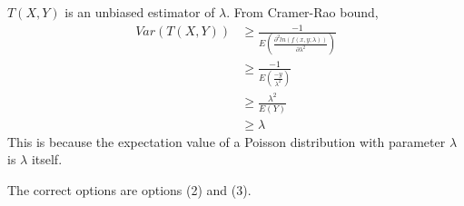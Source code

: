 \documentclass[twocolumn]{article}
\providecommand{\brak}[1]{\ensuremath{\left(#1\right)}}
\theoremstyle{remark}
\numberwithin{equation}{subsection}
\begin{document}
$T(X, Y)$ is an unbiased estimator of $\lambda$.
From Cramer-Rao bound,
\begin{align}
    Var(T(X, Y))&\geq \frac{-1}{E(\frac{\partial^2 ln(f(x,y;\lambda))}{\partial\lambda^2})}\\
    &\geq\frac{-1}{E\brak{\frac{-y}{\lambda^2}}}\\
    &\geq\frac{\lambda^2}{E\brak{Y}}\\
    &\geq \lambda
\end{align}
This is because the expectation value of a Poisson distribution with parameter $\lambda$ is $\lambda$ itself.

The correct options are options (2) and (3).
\end{document}
